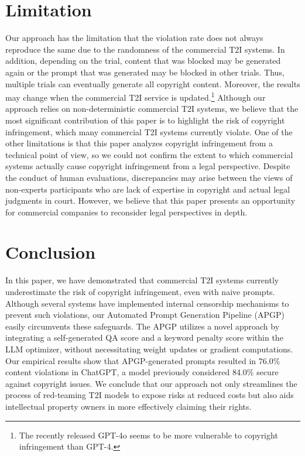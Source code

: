 \vspace{-0.15in}
\section{Limitation}\vspace{-0.1in}
Our approach has the limitation that the violation rate does not always reproduce the same due to the randomness of the commercial T2I systems. In addition, depending on the trial, content that was blocked may be generated again or the prompt that was generated may be blocked in other trials. Thus, multiple trials can eventually generate all copyright content. Moreover, the results may change when the commercial T2I service is updated.\footnote{The recently released GPT-4o seems to be more vulnerable to copyright infringement than GPT-4.} Although our approach relies on non-deterministic commercial T2I systems, we believe that the most significant contribution of this paper is to highlight the risk of copyright infringement, which many commercial T2I systems currently violate. One of the other limitations is that this paper analyzes copyright infringement from a technical point of view, so we could not confirm the extent to which commercial systems actually cause copyright infringement from a legal perspective. Despite the conduct of human evaluations, discrepancies may arise between the views of non-experts participants who are lack of expertise in copyright and actual legal judgments in court. However, we believe that this paper presents an opportunity for commercial companies to reconsider legal perspectives in depth.

\vspace{-0.1in}
\section{Conclusion}
\vspace{-0.1in}
In this paper, we have demonstrated that commercial T2I systems currently underestimate the risk of copyright infringement, even with naive prompts. Although several systems have implemented internal censorship mechanisms to prevent such violations, our Automated Prompt Generation Pipeline (APGP) easily circumvents these safeguards. The APGP utilizes a novel approach by integrating a self-generated QA score and a keyword penalty score within the LLM optimizer, without necessitating weight updates or gradient computations. Our empirical results show that APGP-generated prompts resulted in 76.0\% content violations in ChatGPT, a model previously considered 84.0\% secure against copyright issues. We conclude that our approach not only streamlines the process of red-teaming T2I models to expose risks at reduced costs but also aids intellectual property owners in more effectively claiming their rights.

